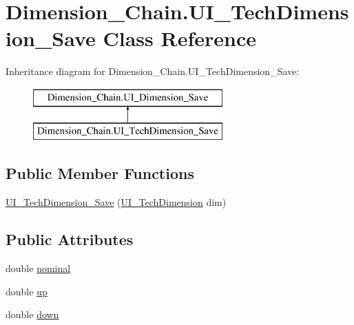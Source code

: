 \hypertarget{class_dimension___chain_1_1_u_i___tech_dimension___save}{}\section{Dimension\+\_\+\+Chain.\+U\+I\+\_\+\+Tech\+Dimension\+\_\+\+Save Class Reference}
\label{class_dimension___chain_1_1_u_i___tech_dimension___save}
Inheritance diagram for Dimension\+\_\+\+Chain.\+U\+I\+\_\+\+Tech\+Dimension\+\_\+\+Save\+:\begin{figure}[H]
\begin{center}
\leavevmode
\includegraphics[height=2.000000cm]{class_dimension___chain_1_1_u_i___tech_dimension___save}
\end{center}
\end{figure}
\subsection*{Public Member Functions}
\begin{DoxyCompactItemize}
\item 
\mbox{\hyperlink{class_dimension___chain_1_1_u_i___tech_dimension___save_a3a30dd2f9cd3a59063a4d0203499d5d0}{U\+I\+\_\+\+Tech\+Dimension\+\_\+\+Save}} (\mbox{\hyperlink{class_dimension___chain_1_1_u_i___tech_dimension}{U\+I\+\_\+\+Tech\+Dimension}} dim)
\end{DoxyCompactItemize}
\subsection*{Public Attributes}
\begin{DoxyCompactItemize}
\item 
double \mbox{\hyperlink{class_dimension___chain_1_1_u_i___tech_dimension___save_ac901919246cbc990670d8167fbb74701}{nominal}}
\item 
double \mbox{\hyperlink{class_dimension___chain_1_1_u_i___tech_dimension___save_a772f22894e61f822e2e31981df04b1ed}{up}}
\item 
double \mbox{\hyperlink{class_dimension___chain_1_1_u_i___tech_dimension___save_aa66f7ad4eae6810976b333fdcf4da52c}{down}}
\end{DoxyCompactItemize}


